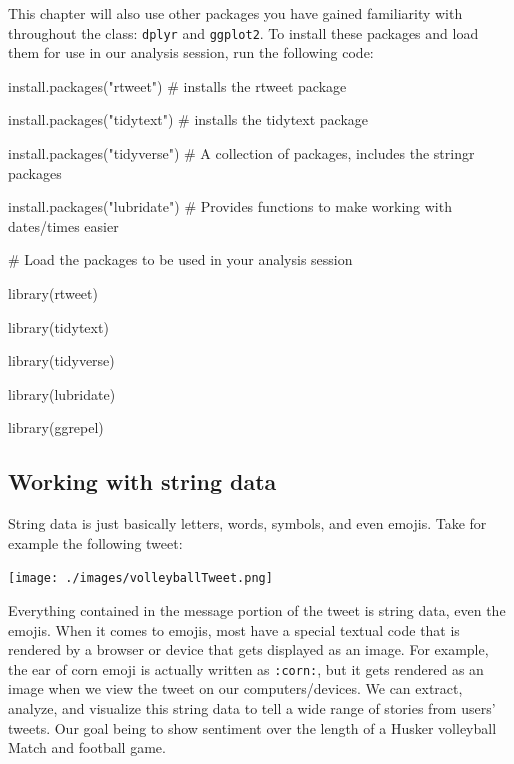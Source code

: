 \documentclass[
  letterpaper,
  DIV=11,
  numbers=noendperiod]{scrreprt}
\newenvironment{Shaded}{\begin{snugshade}}{\end{snugshade}}
\newcommand{\CommentTok}[1]{\textcolor[rgb]{0.37,0.37,0.37}{#1}}
\newcommand{\FunctionTok}[1]{\textcolor[rgb]{0.28,0.35,0.67}{#1}}
\newcommand{\NormalTok}[1]{\textcolor[rgb]{0.00,0.23,0.31}{#1}}
\newcommand{\StringTok}[1]{\textcolor[rgb]{0.13,0.47,0.30}{#1}}
\begin{document}
This chapter will also use other packages you have gained familiarity
with throughout the class: \texttt{dplyr} and \texttt{ggplot2}. To
install these packages and load them for use in our analysis session,
run the following code:

\begin{Shaded}
\begin{Highlighting}[]
\FunctionTok{install.packages}\NormalTok{(}\StringTok{"rtweet"}\NormalTok{) }\CommentTok{\# installs the rtweet package}

\FunctionTok{install.packages}\NormalTok{(}\StringTok{"tidytext"}\NormalTok{) }\CommentTok{\# installs the tidytext package}

\FunctionTok{install.packages}\NormalTok{(}\StringTok{"tidyverse"}\NormalTok{) }\CommentTok{\# A collection of packages, includes the stringr packages}

\FunctionTok{install.packages}\NormalTok{(}\StringTok{"lubridate"}\NormalTok{) }\CommentTok{\# Provides functions to make working with dates/times easier}
\end{Highlighting}
\end{Shaded}

\begin{Shaded}
\begin{Highlighting}[]
\CommentTok{\# Load the packages to be used in your analysis session}

\FunctionTok{library}\NormalTok{(rtweet)}

\FunctionTok{library}\NormalTok{(tidytext)}

\FunctionTok{library}\NormalTok{(tidyverse)}

\FunctionTok{library}\NormalTok{(lubridate)}

\FunctionTok{library}\NormalTok{(ggrepel)}
\end{Highlighting}
\end{Shaded}

\hypertarget{working-with-string-data}{%
\subsection{Working with string data}\label{working-with-string-data}}

String data is just basically letters, words, symbols, and even emojis.
Take for example the following tweet:

\texttt{[image: ./images/volleyballTweet.png]}

Everything contained in the message portion of the tweet is string data,
even the emojis. When it comes to emojis, most have a special textual
code that is rendered by a browser or device that gets displayed as an
image. For example, the ear of corn emoji is actually written as
\texttt{:corn:}, but it gets rendered as an image when we view the tweet
on our computers/devices. We can extract, analyze, and visualize this
string data to tell a wide range of stories from users' tweets. Our goal
being to show sentiment over the length of a Husker volleyball Match and
football game.
\end{document}
